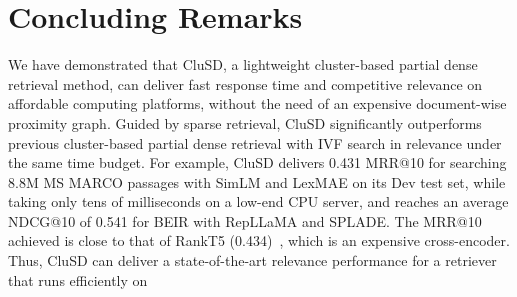 \section{Concluding Remarks}

We have demonstrated that CluSD, a lightweight cluster-based partial dense retrieval method,
can deliver fast response time and competitive relevance on affordable computing platforms,
without the need of an expensive document-wise proximity graph.
Guided by sparse retrieval, CluSD significantly outperforms previous cluster-based partial dense retrieval with IVF 
search in relevance under the same time budget.
For example, CluSD delivers 0.431 MRR@10  for searching 8.8M MS MARCO passages with SimLM and LexMAE 
on its Dev test set, while taking only tens of milliseconds on a low-end CPU server,
and reaches an average NDCG@10 of 0.541 for BEIR with RepLLaMA and SPLADE.  
The MRR@10 achieved is close to that of RankT5 (0.434)~\cite{2023SIGIR-ZhuangRankT5},
which is an expensive cross-encoder.
Thus, CluSD can deliver a state-of-the-art relevance performance for a retriever that runs efficiently on 

